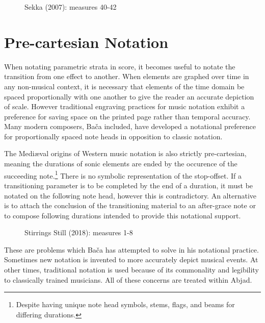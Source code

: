 \begin{figure}[H]
    \caption{Sekka (2007): measures 40-42}
    \label{fig:sekka_mm40-42}
\end{figure}

\section{Pre-cartesian Notation}

When notating parametric strata in score, it becomes useful to notate the transition from one effect to another. When elements are graphed over time in any non-musical context, it is necessary that elements of the time domain be spaced proportionally with one another to give the reader an accurate depiction of scale. However traditional engraving practices for music notation exhibit a preference for saving space on the printed page rather than temporal accuracy. Many modern composers, Ba\v{c}a included, have developed a notational preference for proportionally spaced note heads in opposition to classic notation.

The Medi{\ae}val origins of Western music notation is also strictly pre-cartesian, meaning the durations of sonic elements are ended by the occurence of the succeeding note.\footnote{Despite having unique note head symbols, stems, flags, and beams for differing durations.} There is no symbolic representation of the stop-offset. If a transitioning parameter is to be completed by the end of a duration, it must be notated on the following note head, however this is contradictory. An alternative is to attach the conclusion of the transitioning material to an after-grace note or to compose following durations intended to provide this notational support.

\begin{figure}[H]
    \caption{Stirrings Still (2018): measures 1-8}
    \label{fig:still_mm1-8}
\end{figure}

These are problems which Ba\v{c}a has attempted to solve in his notational practice. Sometimes new notation is invented to more accurately depict musical events. At other times, traditional notation is used because of its commonality and legibility to classically trained musicians. All of these concerns are treated within Abjad.